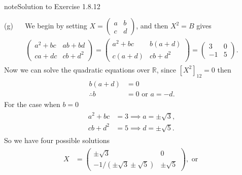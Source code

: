 \documentclass[letterpaper,10pt,english]{jupyterBook}
\begin{document}
\begin{sphinxadmonition}{note}{Solution to Exercise 1.8.12}
\begin{equation*}
\begin{split}
\begin{align*}
\end{align*} \end{split}
\end{equation*}
\sphinxAtStartPar
(g)   We begin by setting \(X = \begin{pmatrix}a & b \\ c & d\end{pmatrix}\), and then \(X^2 = B\) gives
\begin{equation*}
\begin{split} \begin{align*}
    \begin{pmatrix}a^2 + bc & ab + bd \\ ca+dc & cb+d^2\end{pmatrix} =
    \begin{pmatrix} a^2 + bc & b(a + d) \\ c(a + d) & cb + d^2 \end{pmatrix} =
    \begin{pmatrix} 3 & 0 \\ -1 & 5 \end{pmatrix}.
\end{align*} \end{split}
\end{equation*}
\sphinxAtStartPar
Now we can solve the quadratic equations over \(\mathbb{R}\), since \([X^2]_{12} = 0\) then
\begin{equation*}
\begin{split} \begin{align*}
    b(a + d) &= 0 \\
    \therefore b &= 0 \text{ or } a = -d.
\end{align*} \end{split}
\end{equation*}
\sphinxAtStartPar
For the case when \(b = 0\)
\begin{equation*}
\begin{split} \begin{align*}
    a^2 + bc &= 3 \implies a = \pm \sqrt{3}, \\
    cb + d^2 &= 5 \implies d = \pm \sqrt{5}.
\end{align*} \end{split}
\end{equation*}
\sphinxAtStartPar
So we have four possible solutions
\begin{equation*}
\begin{split} \begin{align*}
    X &= \begin{pmatrix} \pm \sqrt{3} & 0 \\ - 1 / (\pm \sqrt{3} \pm \sqrt{5}) & \pm\sqrt{5} \end{pmatrix}, \text{ or }\\

\end{align*}
\end{split}
\end{equation*}
\end{sphinxadmonition}
\end{document}
